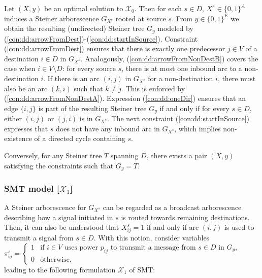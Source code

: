 Let $(X,y)$ be an optimal solution to $\mathcal{X}_0$. 
Then for each $s\in D$, $X^s\in \{0,1\}^{A}$ induces a Steiner arborescence $G_{X^s}$ rooted at source $s$.
From $y\in \{0,1\}^E$ we obtain the resulting (undirected) Steiner tree $G_{y}$ modeled by (\ref{con:dd:arrowFromDest})-(\ref{con:dd:startInSource}).
Constraint (\ref{con:dd:arrowFromDest}) ensures that there is exactly one predecessor $j\in V$ of a destination $i\in D$ in $G_{X^s}$.
Analogously, (\ref{con:dd:arrowFromNonDestB}) covers the case when $i \in V\setminus D$: for every source $s$, there is at most one inbound arc to a non-destination $i$.
If there is an arc $(i,j)$ in $G_{X^s}$ for a non-destination $i$, there must also be an arc $(k,i)$ such that $k\neq j$.
This is enforced by (\ref{con:dd:arrowFromNonDestA}).
Expression (\ref{con:dd:oneDir}) ensures that an edge $\{i,j\}$ is part of the resulting Steiner tree $G_{y}$ if and only if for every $s\in D$, either $(i,j)$ or $(j,i)$ is in $G_{X^s}$.
The next constraint (\ref{con:dd:startInSource}) expresses that $s$ does not have any inbound arc in $G_{X^s}$, which implies non-existence of a directed cycle containing $s$.

Conversely, for any Steiner tree $T$ spanning $D$, there exists a pair $(X,y)$ satisfying the constraints such that $G_y=T$. 

\subsubsection{SMT model [$\mathcal{X}_1$]}

A Steiner arborescence for $G_{X^s}$ can be regarded as a broadcast arborescence describing how a signal initiated in $s$ is routed towards remaining destinations. 
Then, it can also be understood that $X_{ij}^s=1$ if and only if arc $(i,j)$ is used to transmit a signal from $s\in D$.
With this notion, consider variables
\newline\newline
$\pi^s_{ij}=
\begin{cases}
    1 & \text{if $i\in V$ uses power $p_{ij}$ to transmit a message from $s\in D$ in $G_y$},\\
    0 & \text{otherwise},
  \end{cases}$
\newline\newline
leading to the following formulation $\mathcal{X}_1$ of SMT:

